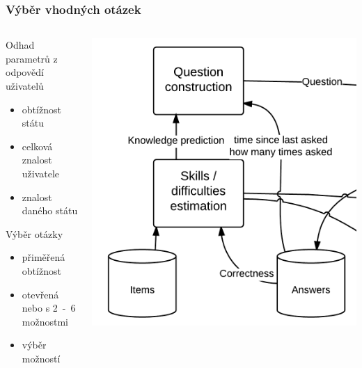 \documentclass[xcolor=svgnames]{beamer}
\begin{document}
\begin{frame}
	\frametitle{Výběr vhodných otázek}
  \begin{columns}
   \begin{column}{.49\textwidth}
      Odhad parametrů z odpovědí uživatelů 
      \begin{itemize}
        \item obtížnost státu
        \item celková znalost uživatele
        \item znalost daného státu 
      \end{itemize}
      Výběr otázky 
      \begin{itemize}
        \item přiměřená obtížnost 
        \item otevřená nebo s 2~-~6 možnostmi
        \item výběr možností
      \end{itemize}
    \end{column}
    \begin{column}{.49\textwidth}
       \includegraphics[width=\textwidth]{img/architecture-server.png}
    \end{column}
  \end{columns}
\end{frame}
\end{document}
